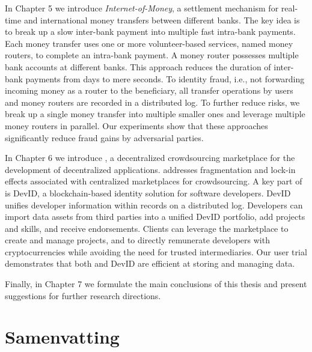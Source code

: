 In Chapter 5 we introduce \emph{Internet-of-Money}, a settlement mechanism for real-time and international money transfers between different banks.
The key idea is to break up a slow inter-bank payment into multiple fast intra-bank payments.
Each money transfer uses one or more volunteer-based services, named money routers, to complete an intra-bank payment.
A money router possesses multiple bank accounts at different banks.
This approach reduces the duration of inter-bank payments from days to mere seconds.
To identity fraud, i.e., not forwarding incoming money as a router to the beneficiary, all transfer operations by users and money routers are recorded in a distributed log.
To further reduce risks, we break up a single money transfer into multiple smaller ones and leverage multiple money routers in parallel.
Our experiments show that these approaches significantly reduce fraud gains by adversarial parties.

In Chapter 6 we introduce \emph{\Dappcoder{}}, a decentralized crowdsourcing marketplace for the development of decentralized applications.
\Dappcoder{} addresses fragmentation and lock-in effects associated with centralized marketplaces for crowdsourcing.
A key part of \Dappcoder{} is DevID, a blockchain-based identity solution for software developers.
DevID unifies developer information within records on a distributed log.
Developers can import data assets from third parties into a unified DevID portfolio, add projects and skills, and receive endorsements.
Clients can leverage the \Dappcoder{} marketplace to create and manage projects, and to directly remunerate developers with cryptocurrencies while avoiding the need for trusted intermediaries.
Our user trial demonstrates that both \Dappcoder{} and DevID are efficient at storing and managing data.

Finally, in Chapter 7 we formulate the main conclusions of this thesis and present suggestions for further research directions.

\chapter*{Samenvatting}

